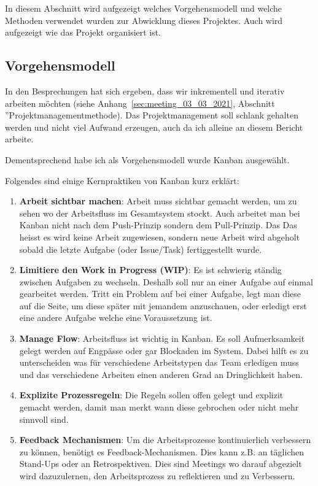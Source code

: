 In diesem Abschnitt wird aufgezeigt welches Vorgehensmodell und welche Methoden verwendet wurden zur Abwicklung dieses Projektes.
Auch wird aufgezeigt wie das Projekt organisiert ist.

\subsection{Vorgehensmodell}

 In den Besprechungen hat sich ergeben, dass wir inkrementell und iterativ arbeiten möchten
(siehe Anhang~\ref{sec:meeting_03_03_2021}, Abschnitt ''Projektmanagementmethode).
Das Projektmanagement soll schlank gehalten werden und nicht viel Aufwand erzeugen, auch da ich alleine an diesem Bericht arbeite.

Dementsprechend habe ich als Vorgehensmodell wurde Kanban ausgewählt.

Folgendes sind einige Kernpraktiken von Kanban kurz erklärt:

\begin{enumerate}
    \item \textbf{Arbeit sichtbar machen}: Arbeit muss sichtbar gemacht werden, um zu sehen wo der Arbeitsfluss im Gesamtsystem stockt.
        Auch arbeitet man bei Kanban nicht nach dem Push-Prinzip sondern dem Pull-Prinzip. Das 
        Das heisst es wird keine Arbeit zugewiesen, sondern neue Arbeit wird abgeholt sobald die letzte Aufgabe (oder Issue/Task) fertiggestellt wurde.
    \item \textbf{Limitiere den Work in Progress (WIP)}: Es ist schwierig ständig zwischen Aufgaben zu wechseln. Deshalb soll nur an einer Aufgabe auf einmal gearbeitet werden. Tritt ein Problem auf bei einer Aufgabe, legt man diese auf die Seite, um diese später mit jemandem anzuschauen, oder erledigt erst eine andere Aufgabe welche eine Voraussetzung ist.
    \item \textbf{Manage Flow}: Arbeitsfluss ist wichtig in Kanban. Es soll Aufmerksamkeit gelegt werden auf Engpässe oder gar Blockaden im System. Dabei hilft es zu unterscheiden was für verschiedene Arbeitstypen das Team erledigen muss und das verschiedene Arbeiten einen anderen Grad an Dringlichkeit haben.
    \item \textbf{Explizite Prozessregeln}: Die Regeln sollen offen gelegt und explizit gemacht werden, damit man merkt wann diese gebrochen oder nicht mehr sinnvoll sind.
    \item \textbf{Feedback Mechanismen}: Um die Arbeitsprozesse kontinuierlich verbessern zu können, benötigt es Feedback-Mechanismen. Dies kann z.B. an täglichen Stand-Ups oder an Retrospektiven. Dies sind Meetings wo darauf abgezielt wird dazuzulernen, den Arbeitsprozess zu reflektieren und  zu Verbessern.
\end{enumerate}

